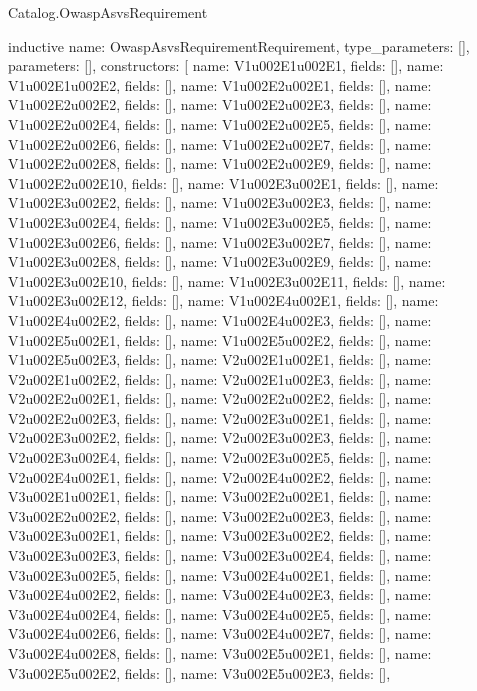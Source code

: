 \begin{lexlean}{Catalog.OwaspAsvsRequirement}
\begin{semanticmodule}
inductive{
  name: OwaspAsvsRequirementRequirement,
  type_parameters: [],
  parameters: [],
  constructors: [
    {name: V1u002E1u002E1, fields: []},
    {name: V1u002E1u002E2, fields: []},
    {name: V1u002E2u002E1, fields: []},
    {name: V1u002E2u002E2, fields: []},
    {name: V1u002E2u002E3, fields: []},
    {name: V1u002E2u002E4, fields: []},
    {name: V1u002E2u002E5, fields: []},
    {name: V1u002E2u002E6, fields: []},
    {name: V1u002E2u002E7, fields: []},
    {name: V1u002E2u002E8, fields: []},
    {name: V1u002E2u002E9, fields: []},
    {name: V1u002E2u002E10, fields: []},
    {name: V1u002E3u002E1, fields: []},
    {name: V1u002E3u002E2, fields: []},
    {name: V1u002E3u002E3, fields: []},
    {name: V1u002E3u002E4, fields: []},
    {name: V1u002E3u002E5, fields: []},
    {name: V1u002E3u002E6, fields: []},
    {name: V1u002E3u002E7, fields: []},
    {name: V1u002E3u002E8, fields: []},
    {name: V1u002E3u002E9, fields: []},
    {name: V1u002E3u002E10, fields: []},
    {name: V1u002E3u002E11, fields: []},
    {name: V1u002E3u002E12, fields: []},
    {name: V1u002E4u002E1, fields: []},
    {name: V1u002E4u002E2, fields: []},
    {name: V1u002E4u002E3, fields: []},
    {name: V1u002E5u002E1, fields: []},
    {name: V1u002E5u002E2, fields: []},
    {name: V1u002E5u002E3, fields: []},
    {name: V2u002E1u002E1, fields: []},
    {name: V2u002E1u002E2, fields: []},
    {name: V2u002E1u002E3, fields: []},
    {name: V2u002E2u002E1, fields: []},
    {name: V2u002E2u002E2, fields: []},
    {name: V2u002E2u002E3, fields: []},
    {name: V2u002E3u002E1, fields: []},
    {name: V2u002E3u002E2, fields: []},
    {name: V2u002E3u002E3, fields: []},
    {name: V2u002E3u002E4, fields: []},
    {name: V2u002E3u002E5, fields: []},
    {name: V2u002E4u002E1, fields: []},
    {name: V2u002E4u002E2, fields: []},
    {name: V3u002E1u002E1, fields: []},
    {name: V3u002E2u002E1, fields: []},
    {name: V3u002E2u002E2, fields: []},
    {name: V3u002E2u002E3, fields: []},
    {name: V3u002E3u002E1, fields: []},
    {name: V3u002E3u002E2, fields: []},
    {name: V3u002E3u002E3, fields: []},
    {name: V3u002E3u002E4, fields: []},
    {name: V3u002E3u002E5, fields: []},
    {name: V3u002E4u002E1, fields: []},
    {name: V3u002E4u002E2, fields: []},
    {name: V3u002E4u002E3, fields: []},
    {name: V3u002E4u002E4, fields: []},
    {name: V3u002E4u002E5, fields: []},
    {name: V3u002E4u002E6, fields: []},
    {name: V3u002E4u002E7, fields: []},
    {name: V3u002E4u002E8, fields: []},
    {name: V3u002E5u002E1, fields: []},
    {name: V3u002E5u002E2, fields: []},
    {name: V3u002E5u002E3, fields: []},
}
\end{semanticmodule}
\end{lexlean}
